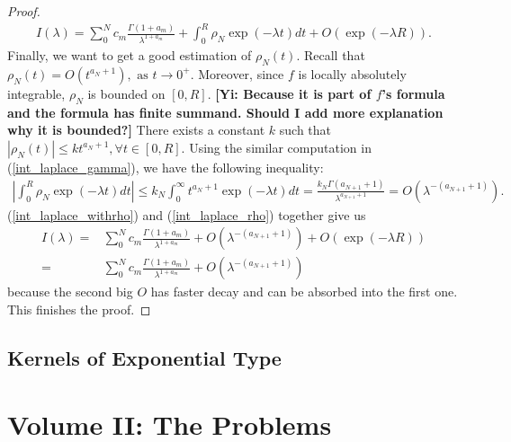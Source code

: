 \documentclass[10pt]{article}
\newcommand{\gy}[1]{\textbf{\color{red}[Yi: #1]}}
\newenvironment{Proof of lemma}{\noindent{\bf Proof of Lemma}}{\hfill$\Box$\newline}
\newenvironment{Proof of claim}{\noindent{\bf Proof of claim}}{\hfill$\Box$\newline}
\newenvironment{Proof of theorem}{\noindent{\bf Proof of Theorem}}{\hfill\scriptsize{$\Box$}\newline}
\newenvironment{Proof of theorems}{\noindent{\bf Proof of Theorems}}{\hfill$\Box$\newline}
\newenvironment{Proof of proposition}{\noindent{\bf Proof of Proposition}}{\hfill$\Box$\newline}
\newenvironment{Proof of propositions}{\noindent{\bf Proof of Propositions}}{\hfill$\Box$\newline}
\newenvironment{Proof of exercise}{\noindent{\it Proof of Exercise:}}{\hfill$\Box$}
\numberwithin{equation}{section}
\begin{document}
\begin{proof}
\begin{align}
        I(\lambda) = \sum_0^N c_m \frac{\Gamma(1+a_m)}{\lambda^{1+a_m}} + \int_0^R \rho_N \exp(-\lambda t) dt + O(\exp(-\lambda R)).
    \end{align}
    Finally, we want to get a good estimation of $\rho_N(t)$. Recall that $\rho_N(t) = O(t^{a_N+1}), \text{ as } t\to 0^+$. Moreover, since $f$ is locally absolutely integrable, $\rho_N$ is bounded on $[0,R]$. \gy{Because it is part of $f$'s formula and the formula has finite summand. Should I add more explanation why it is bounded?} There exists a constant $k$ such that $|\rho_N(t)| \leq kt^{a_N+1}, \forall t \in [0,R]$. Using the similar computation in (\ref{int_laplace_gamma}), we have the following inequality:
    \begin{align} \label{int_laplace_rho}
        \left | \int_0^R \rho_N \exp(-\lambda t) dt \right | \leq k_N \int_0^{\infty} t^{a_N+1} \exp(-\lambda t) dt = \frac{k_N \Gamma(a_{N+1}+1)}{\lambda^{a_{N+1}+1}} = O(\lambda^{-(a_{N+1}+1)}).
    \end{align}
    (\ref{int_laplace_withrho}) and (\ref{int_laplace_rho}) together give us
    \begin{align}
        I(\lambda) =& \sum_0^N c_m \frac{\Gamma(1+a_m)}{\lambda^{1+a_m}} + O(\lambda^{-(a_{N+1}+1)}) + O(\exp(-\lambda R)) \nonumber \\
        =& \sum_0^N c_m \frac{\Gamma(1+a_m)}{\lambda^{1+a_m}} + O(\lambda^{-(a_{N+1}+1)})
    \end{align}
    because the second big $O$ has faster decay and can be absorbed into the first one. This finishes the proof.
\end{proof}
\subsection{Kernels of Exponential Type}
\section{Volume II: The Problems}
\end{document}
